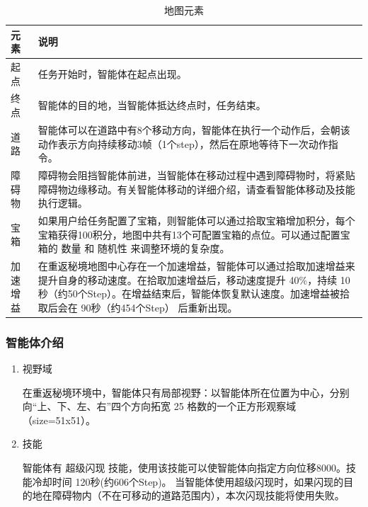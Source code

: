 \begin{table}[H]
    \begin{tabularx}{1\textwidth}{ l X } %
        \hline %
        \textbf{元素} & \textbf{说明}  \\
        \hline
        起点 & 任务开始时，智能体在起点出现。 \\
        终点 & 智能体的目的地，当智能体抵达终点时，任务结束。 \\
        道路 & 智能体可以在道路中有8个移动方向，智能体在执行一个动作后，会朝该动作表示方向持续移动3帧（1个step），然后在原地等待下一次动作指令。\\
        障碍物& 障碍物会阻挡智能体前进，当智能体在移动过程中遇到障碍物时，将紧贴障碍物边缘移动。有关智能体移动的详细介绍，请查看智能体移动及技能执行逻辑。\\
        宝箱 & 如果用户给任务配置了宝箱，则智能体可以通过拾取宝箱增加积分，每个宝箱获得100积分，地图中共有13个可配置宝箱的点位。可以通过配置宝箱的 数量 和 随机性 来调整环境的复杂度。 \\
        加速增益 & 在重返秘境地图中心存在一个加速增益，智能体可以通过拾取加速增益来提升自身的移动速度。在拾取加速增益后，移动速度提升 40\%，持续 10秒（约50个Step）。在增益结束后，智能体恢复默认速度。加速增益被拾取后会在 90秒（约454个Step） 后重新出现。 \\
        \hline
    \end{tabularx}

    \centering
    \caption{地图元素}
    \label{elements}
\end{table}

\subsubsection{智能体介绍}

\begin{enumerate}
    \item 视野域

    在重返秘境环境中，智能体只有局部视野：以智能体所在位置为中心，分别向“上、下、左、右”四个方向拓宽 25 格数的一个正方形观察域（size=51x51）。

    \item 技能

    智能体有 超级闪现 技能，使用该技能可以使智能体向指定方向位移8000。技能冷却时间 120秒(约606个Step)。
    当智能体使用超级闪现时，如果闪现的目的地在障碍物内（不在可移动的道路范围内），本次闪现技能将使用失败。
\end{enumerate}

